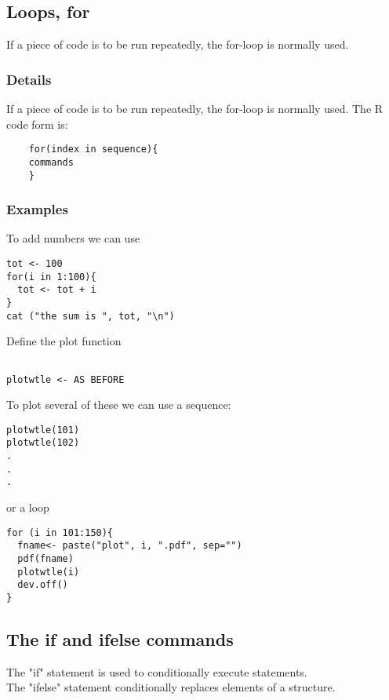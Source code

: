 \documentclass[12pt,a4paper]{article}
\theoremstyle{regla}
\theoremstyle{remark}
\theoremstyle{definition}
\theoremstyle{nonumberbreak}
\begin{document}
\subsection{Loops, for}
\begin{fbox}
\begin{minipage}{0.97\textwidth}
If a piece of code is to be run repeatedly, the for-loop is normally used. 
\end{minipage}
\end{fbox}
\subsubsection{Details}
If a piece of code is to be run repeatedly, the for-loop is normally used. The R code form is:
\begin{lstlisting}
	for(index in sequence){
	commands
	}
\end{lstlisting}
\subsubsection{Examples}
\begin{xmpl}
To add numbers we can use

\begin{lstlisting}
tot <- 100
for(i in 1:100){
  tot <- tot + i
}
cat ("the sum is ", tot, "\n")
\end{lstlisting}
\end{xmpl}
\begin{xmpl}

Define the plot function

\begin{lstlisting}

plotwtle <- AS BEFORE
\end{lstlisting}

To plot several of these we can use a sequence:
\begin{lstlisting}
plotwtle(101)
plotwtle(102)
.
.
.
\end{lstlisting}
or a loop
\begin{lstlisting}
for (i in 101:150){
  fname<- paste("plot", i, ".pdf", sep="")
  pdf(fname)
  plotwtle(i)
  dev.off()
}
\end{lstlisting}
\end{xmpl}

\subsection{The if and ifelse commands}
\begin{fbox}
\begin{minipage}{0.97\textwidth}
The "if" statement is used to conditionally execute statements.\\
The "ifelse" statement conditionally replaces elements of a structure.\\
\end{minipage}
\end{fbox}
\end{document}
